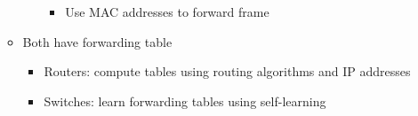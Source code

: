 \begin{itemize}
\begin{itemize}
\begin{itemize}
\begin{itemize}
              \item Use MAC addresses to forward frame

            \end{itemize}

        \end{itemize}

      \item Both have forwarding table

        \begin{itemize}

          \item Routers: compute tables using routing algorithms and IP addresses

          \item Switches: learn forwarding tables using self-learning

        \end{itemize}

    \end{itemize}

\end{itemize}



